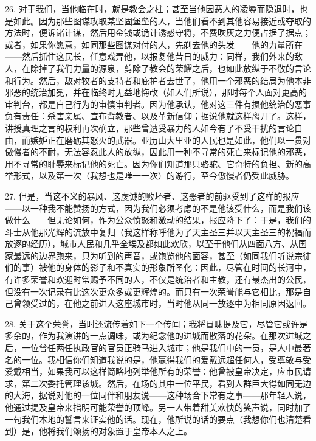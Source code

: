26. 对于我们，当他临在时，就是教会之柱；甚至当他因恶人的凌辱而隐退时，也是如此。因为那些图谋攻取某坚固堡垒的人，当他们看不到其他容易接近或夺取的方法时，便诉诸计谋，然后用金钱或诡计诱惑守将，不费吹灰之力便占据了据点；或者，如果你愿意，如同那些图谋对付的人，先剃去他的头发——他的力量所在——然后抓住这民长，任意戏弄他，以报复他昔日的威力：同样，我们外来的敌人，在除掉了我们力量的源泉，剪除了教会的荣耀之后，也如此放纵于不敬的言论和行为。然后，敌对牧者的支持者和庇护者去世了，他用一个邪恶的结局为他本非邪恶的统治加冕，并在临终时无益地悔改（如人们所说），那时每个人面对更高的审判台，都是自己行为的审慎审判者。因为他承认，他对这三件有损他统治的恶事负有责任：杀害亲属、宣布背教者、以及革新信仰；据说他就这样离开了。这样，讲授真理之言的权利再次确立，那些曾遭受暴力的人如今有了不受干扰的言论自由，而嫉妒正在磨砺其怒火的武器。亚历山大里亚的人民也是如此，他们以一贯对傲慢者的不耐，无法容忍此人的放纵，因此用一种不寻常的死亡来标记他的邪恶，用不寻常的耻辱来标记他的死亡。因为你们知道那只骆驼、它奇特的负担、新的高举形式，以及第一次（我想也是唯一一次）的游行，至今傲慢者仍受此威胁。\par

27. 但是，当这不义的暴风、这虔诚的败坏者、这恶者的前驱受到了这样的报应——以一种我不能赞扬的方式，因为我们必须考虑的不是他该受什么，而是我们该做什么——但无论如何，作为公众愤怒和激动的结果，报应降下了：于是，我们的斗士从他那光辉的流放中复归（我这样称呼他为了天主圣三并以天主圣三的祝福而放逐的经历），城市人民和几乎全埃及都如此欢欣，以至于他们从四面八方、从国家最远的边界跑来，只为听到的声音，或饱览他的面容，甚至（如同我们听说宗徒们的事）被他的身体的影子和不真实的形象所圣化：因此，尽管在时间的长河中，有许多荣誉和欢迎时常赐予不同的人，不仅是统治者和主教，还有最杰出的公民，但没有一次记录有比这次更众多或更辉煌的。而只有一次荣誉能与它相比，那是自己曾领受过的，在他之前进入这座城市时，当时他从同一放逐中为相同原因返回。\par

28. 关于这个荣誉，当时还流传着如下一个传闻；我将冒昧提及它，尽管它或许是多余的，作为我演讲的一点调味，或为纪念他的进城而散落的花朵。在那次进城之后，一位曾任两任执政官的官员正骑马进入城市；他是我们中的一员，是人中最著名的一位。我相信你们知道我说的是，他赢得我们的爱戴远超任何人，受尊敬与受爱戴相当，如果我可以这样简略地列举他所有的荣誉：他曾被皇帝决定，应市民请求，第二次委托管理该城。然后，在场的其中一位平民，看到人群巨大得如同无边的大海，据说对他的一位同伴和朋友说——这种场合下常有之事——那年轻人说，他通过提及皇帝来指明可能荣誉的顶峰。另一人带着甜美欢快的笑声说，同时加了一句我们本地的誓言来证实他的话。现在，他所说的话的要点（我想你们也清楚看到）是，他将我们颂扬的对象置于皇帝本人之上。\par


